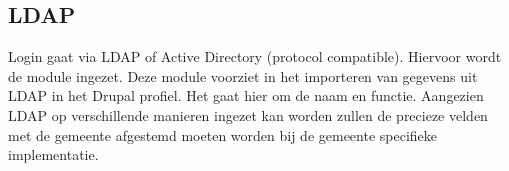 \subsection{LDAP}\label{ldap}

Login gaat via LDAP of Active Directory (protocol compatible). Hiervoor wordt de  module ingezet. Deze module voorziet in het importeren van gegevens uit LDAP in het Drupal profiel. Het gaat hier om de naam en functie. Aangezien LDAP op verschillende manieren ingezet kan worden zullen de precieze velden met de gemeente afgestemd moeten worden bij de gemeente specifieke implementatie.
